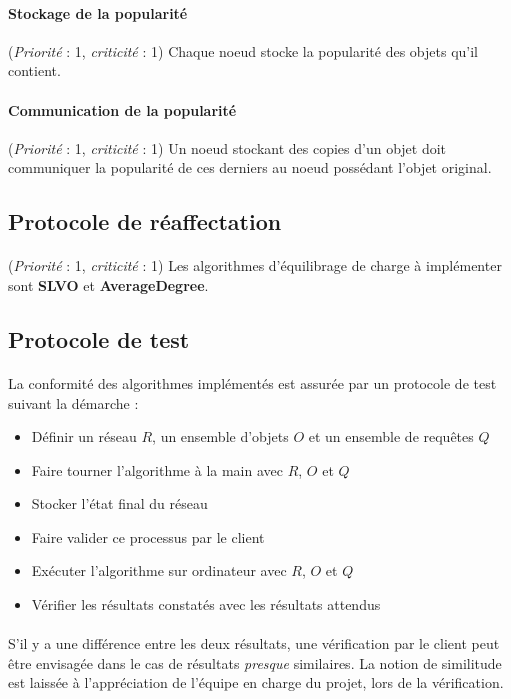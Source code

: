 \documentclass[12pt]{article}
\newcommand{\besoin}[2] {
  (\textit{Priorité} : #1, \textit{criticité} : #2)
}
\begin{document}
\paragraph{Stockage de la popularité} \besoin{1}{1} Chaque noeud stocke la popularité des objets qu'il contient.

\paragraph{Communication de la popularité} \besoin{1}{1} Un noeud stockant des copies d'un objet doit communiquer la popularité de ces derniers au noeud possédant l'objet original.


\subsection{Protocole de réaffectation}

\paragraph{} \besoin{1}{1} Les algorithmes d'équilibrage de charge à implémenter sont \textbf{SLVO} et \textbf{AverageDegree}.


\subsection{Protocole de test}

\paragraph{} La conformité des algorithmes implémentés est assurée par un protocole de test suivant la démarche :

\begin{itemize}
	\item Définir un réseau $R$, un ensemble d'objets $O$ et un ensemble de requêtes $Q$
	\item Faire tourner l'algorithme à la main avec $R$, $O$ et $Q$
	\item Stocker l'état final du réseau
	\item Faire valider ce processus par le client
	\item Exécuter l'algorithme sur ordinateur avec $R$, $O$ et $Q$
	\item Vérifier les résultats constatés avec les résultats attendus
\end{itemize}
	
\paragraph{} S'il y a une différence entre les deux résultats, une vérification par le client peut être envisagée dans le cas de résultats \textit{presque} similaires. 
La notion de similitude est laissée à l'appréciation de l'équipe en charge du projet, lors de la vérification.
\end{document}
